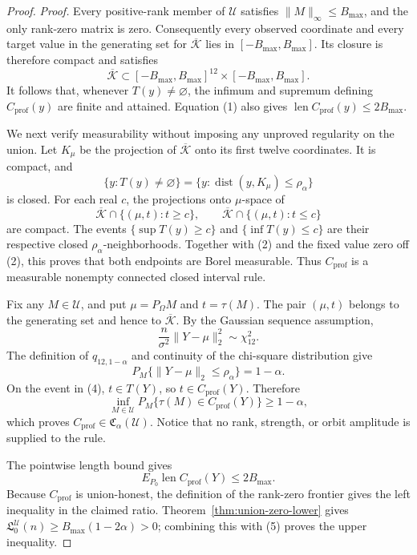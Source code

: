 \documentclass{article}
\begin{document}
\begin{proof}
\textit{Proof.}
Every positive-rank member of \(\mathcal U\) satisfies \(\lVert M\rVert_\infty\leq B_{\max}\), and the only rank-zero matrix is zero.  Consequently every observed coordinate and every target value in the generating set for \(\overline{\mathcal K}\) lies in \([-B_{\max},B_{\max}]\).  Its closure is therefore compact and satisfies
\[
 \overline{\mathcal K}\subset[-B_{\max},B_{\max}]^{12}\times[-B_{\max},B_{\max}].
\tag{1}
\]
It follows that, whenever \(T(y)\neq\varnothing\), the infimum and supremum defining \(C_{\mathrm{prof}}(y)\) are finite and attained.  Equation (1) also gives
\(\operatorname{len}C_{\mathrm{prof}}(y)\leq2B_{\max}\).

We next verify measurability without imposing any unproved regularity on the union.  Let \(K_\mu\) be the projection of \(\overline{\mathcal K}\) onto its first twelve coordinates.  It is compact, and
\[
 \{y:T(y)\neq\varnothing\}=\{y:\operatorname{dist}(y,K_\mu)\leq\rho_\alpha\}
\tag{2}
\]
is closed.  For each real \(c\), the projections onto \(\mu\)-space of
\[
 \overline{\mathcal K}\cap\{(\mu,t):t\geq c\},
 \qquad
 \overline{\mathcal K}\cap\{(\mu,t):t\leq c\}
\]
are compact.  The events \(\{\sup T(y)\geq c\}\) and \(\{\inf T(y)\leq c\}\) are their respective closed \(\rho_\alpha\)-neighborhoods.  Together with (2) and the fixed value zero off (2), this proves that both endpoints are Borel measurable.  Thus \(C_{\mathrm{prof}}\) is a measurable nonempty connected closed interval rule.

Fix any \(M\in\mathcal U\), and put \(\mu=P_\Omega M\) and \(t=\tau(M)\).  The pair \((\mu,t)\) belongs to the generating set and hence to \(\overline{\mathcal K}\).  By the Gaussian sequence assumption,
\[
 \frac{n}{\sigma^2}\lVert Y-\mu\rVert_2^2\sim\chi^2_{12}.
\tag{3}
\]
The definition of \(q_{12,1-\alpha}\) and continuity of the chi-square distribution give
\[
 P_M\{\lVert Y-\mu\rVert_2\leq\rho_\alpha\}=1-\alpha.
\tag{4}
\]
On the event in (4), \(t\in T(Y)\), so \(t\in C_{\mathrm{prof}}(Y)\).  Therefore
\[
 \inf_{M\in\mathcal U}P_M\{\tau(M)\in C_{\mathrm{prof}}(Y)\}\geq1-\alpha,
\]
which proves \(C_{\mathrm{prof}}\in\mathfrak C_\alpha(\mathcal U)\).  Notice that no rank, strength, or orbit amplitude is supplied to the rule.

The pointwise length bound gives
\[
 E_{P_0}\operatorname{len}C_{\mathrm{prof}}(Y)\leq2B_{\max}.
\tag{5}
\]
Because \(C_{\mathrm{prof}}\) is union-honest, the definition of the rank-zero frontier gives the left inequality in the claimed ratio.  Theorem~\ref{thm:union-zero-lower} gives
\(\mathfrak L_0^{\mathcal U}(n)\geq B_{\max}(1-2\alpha)>0\); combining this with (5) proves the upper inequality.


\end{proof}
\end{document}
